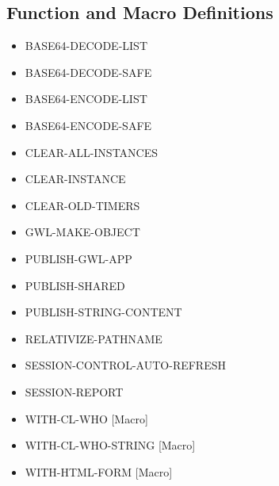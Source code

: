 \documentclass [11pt]{book}
\begin{document}
\subsection{Function and Macro Definitions}

\label{subsec:functionandmacrodefinitions}



\begin{itemize}

\item {}BASE64-DECODE-LIST

\item {}BASE64-DECODE-SAFE

\item {}BASE64-ENCODE-LIST

\item {}BASE64-ENCODE-SAFE

\item {}CLEAR-ALL-INSTANCES

\item {}CLEAR-INSTANCE

\item {}CLEAR-OLD-TIMERS

\item {}GWL-MAKE-OBJECT

\item {}PUBLISH-GWL-APP

\item {}PUBLISH-SHARED

\item {}PUBLISH-STRING-CONTENT

\item {}RELATIVIZE-PATHNAME

\item {}SESSION-CONTROL-AUTO-REFRESH

\item {}SESSION-REPORT

\item {}WITH-CL-WHO [Macro]

\item {}WITH-CL-WHO-STRING [Macro]

\item {}WITH-HTML-FORM [Macro]

\end{itemize}
\end{document}
